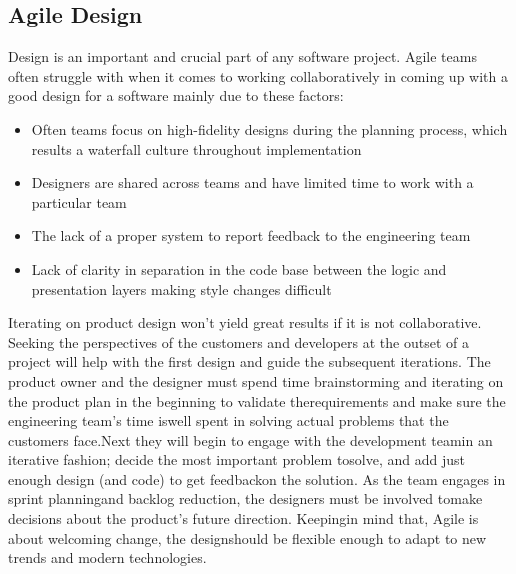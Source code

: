 \documentclass[sigplan,screen]{acmart}
\begin{document}
\subsection{Agile Design}
Design is an important and crucial part of any software project. Agile teams often struggle with when it comes to working collaboratively in coming up with a good design for a software mainly due to these factors:
\begin{itemize}
    \item Often teams focus on high-fidelity designs during the planning process, which results a waterfall culture throughout implementation
    \item Designers are shared across teams and have limited time to work with a particular team
    \item The lack of a proper system to report feedback to the engineering team
    \item Lack of clarity in separation in the code base between the logic and presentation layers making style changes difficult
\end{itemize}
Iterating on product design won't yield great results if it is not collaborative. Seeking the perspectives of the customers and developers at the outset of a project will help with the first design and guide the subsequent iterations. The product owner and the designer must spend time brainstorming and iterating on the product plan in the beginning to validate therequirements and make sure the engineering team’s time iswell spent in solving actual problems that the customers face.Next they will begin to engage with the development teamin an iterative fashion; decide the most important problem tosolve, and add just enough design (and code) to get feedbackon the solution. As the team engages in sprint planningand backlog reduction, the designers must be involved tomake decisions about the product’s future direction. Keepingin mind that, Agile is about welcoming change, the designshould be flexible enough to adapt to new trends and modern technologies.
\end{document}
